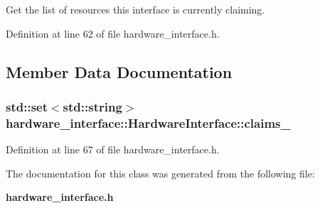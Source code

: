 \-Get the list of resources this interface is currently claiming. 



\-Definition at line 62 of file hardware\-\_\-interface.\-h.



\subsection{\-Member \-Data \-Documentation}
\subsubsection[{claims\-\_\-}]{\setlength{\rightskip}{0pt plus 5cm}std\-::set$<$std\-::string$>$ {\bf hardware\-\_\-interface\-::\-Hardware\-Interface\-::claims\-\_\-}\hspace{0.3cm}{\ttfamily  [private]}}\label{classhardware__interface_1_1HardwareInterface_a739621a61c83be71e29200f55fede47d}


\-Definition at line 67 of file hardware\-\_\-interface.\-h.



\-The documentation for this class was generated from the following file\-:\begin{DoxyCompactItemize}
\item 
{\bf hardware\-\_\-interface.\-h}\end{DoxyCompactItemize}
